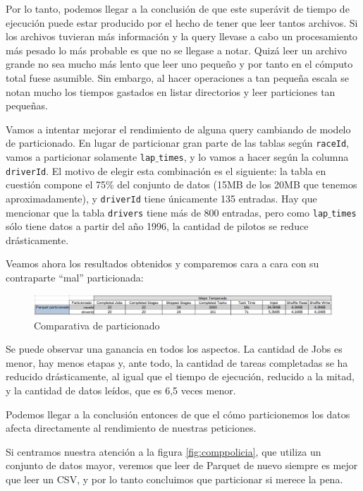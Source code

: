 \documentclass[12pt,twoside,titlepage]{report}
\newcommand{\quotes}[1]{``#1''}
\begin{document}
Por lo tanto, podemos llegar a la conclusión de que este superávit de tiempo de ejecución puede estar producido por el hecho de tener que leer tantos archivos. Si los archivos tuvieran más información y la query llevase a cabo un procesamiento más pesado lo más probable es que no se llegase a notar. Quizá leer un archivo grande no sea mucho más lento que leer uno pequeño y por tanto en el cómputo total fuese asumible. Sin embargo, al hacer operaciones a tan pequeña escala se notan mucho los tiempos gastados en listar directorios y leer particiones tan pequeñas.

Vamos a intentar mejorar el rendimiento de alguna query cambiando de modelo de particionado. En lugar de particionar gran parte de las tablas según \texttt{raceId}, vamos a particionar solamente \texttt{lap$\_$times}, y lo vamos a hacer según la columna \texttt{driverId}. El motivo de elegir esta combinación es el siguiente: la tabla en cuestión compone el 75\% del conjunto de datos (15MB de los 20MB que tenemos aproximadamente), y \texttt{driverId} tiene únicamente 135 entradas. Hay que mencionar que la tabla \texttt{drivers} tiene más de 800 entradas, pero como \texttt{lap$\_$times} sólo tiene datos a partir del año 1996, la cantidad de pilotos se reduce drásticamente.

Veamos ahora los resultados obtenidos y comparemos cara a cara con su contraparte \quotes{mal} particionada:

\begin{figure}[H]
	\includegraphics[scale=0.29]{comparativaparticionado.png}
	\centering
	\caption{Comparativa de particionado}
	\label{fig:comparativaparticionado}
	\centering
\end{figure}

Se puede observar una ganancia en todos los aspectos. La cantidad de Jobs es menor, hay menos etapas y, ante todo, la cantidad de tareas completadas se ha reducido drásticamente, al igual que el tiempo de ejecución, reducido a la mitad, y la cantidad de datos leídos, que es 6,5 veces menor.

Podemos llegar a la conclusión entonces de que el cómo particionemos los datos afecta directamente al rendimiento de nuestras peticiones.

Si centramos nuestra atención a la figura \ref{fig:comppolicia}, que utiliza un conjunto de datos mayor, veremos que leer de Parquet de nuevo siempre es mejor que leer un CSV, y por lo tanto concluimos que particionar si merece la pena.
\end{document}
